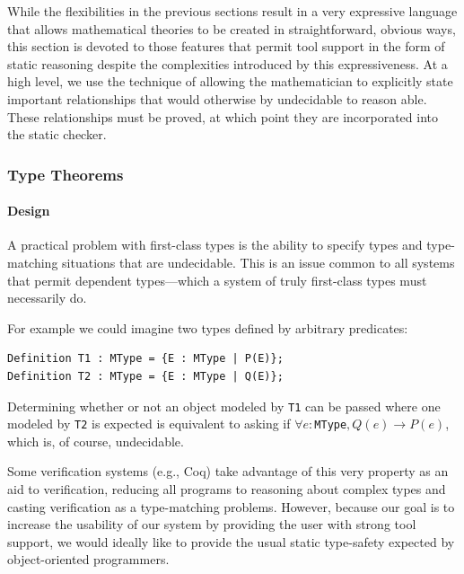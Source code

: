 While the flexibilities in the previous sections result in a very expressive language that allows mathematical theories to be created in straightforward, obvious ways, this section is devoted to those features that permit tool support in the form of static reasoning despite the complexities introduced by this expressiveness.  At a high level, we use the technique of allowing the mathematician to explicitly state important relationships that would otherwise by undecidable to reason able.  These relationships must be proved, at which point they are incorporated into the static checker.

		\subsubsection{Type Theorems\label{typeTheorems}}

\paragraph{Design\label{typeTheoremDesign}}
A practical problem with first-class types is the ability to specify types and type-matching situations that are undecidable.  This is an issue common to all systems that permit dependent types---which a system of truly first-class types must necessarily do.

For example we could imagine two types defined by arbitrary predicates:

\begin{lstlisting}
Definition T1 : MType = {E : MType | P(E)};
Definition T2 : MType = {E : MType | Q(E)};
\end{lstlisting}

Determining whether or not an object modeled by \texttt{T1} can be passed where one modeled by \texttt{T2} is expected is equivalent to asking if $\forall e : $\texttt{MType}$, Q(e) \rightarrow P(e)$, which is, of course, undecidable.

Some verification systems (e.g., Coq) take advantage of this very property as an aid to verification, reducing all programs to reasoning about complex types and casting verification as a type-matching problems.  However, because our goal is to increase the usability of our system by providing the user with strong tool support, we would ideally like to provide the usual static type-safety expected by object-oriented programmers.

